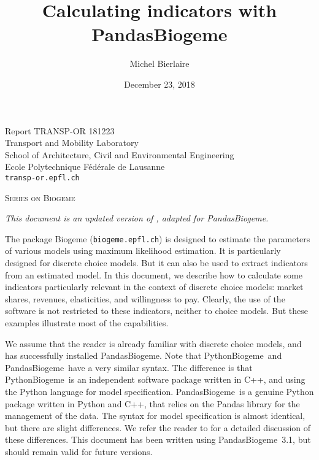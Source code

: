 \documentclass[12pt,a4paper]{article}
\title{Calculating  indicators with PandasBiogeme}
\author{Michel Bierlaire}
\date{December 23, 2018}
\newcommand{\PBIOGEME}{PythonBiogeme}
\newcommand{\PDBIOGEME}{PandasBiogeme}
\begin{document}
\begin{titlepage}
\pagestyle{empty}

\maketitle
\vspace{2cm}

\begin{center}
\small Report TRANSP-OR 181223\\ Transport and Mobility Laboratory \\ School of Architecture, Civil and Environmental Engineering \\ Ecole Polytechnique F\'ed\'erale de Lausanne \\ \verb+transp-or.epfl.ch+
\begin{center}
\textsc{Series on Biogeme}
\end{center}
\end{center}


\clearpage
\end{titlepage}

\emph{This document is an updated version of ,
  adapted for PandasBiogeme.}

The package Biogeme (\texttt{biogeme.epfl.ch}) is designed to estimate the parameters of
various models using maximum likelihood estimation. It is particularly
designed for discrete choice models. But it can also be used to extract indicators from an estimated
model. In this document, we describe how to calculate some indicators
particularly relevant in the context of discrete choice models: market
shares, revenues, elasticities, and willingness to pay. Clearly, the
use of the software is not restricted to these indicators, neither to
choice models. But these examples illustrate most of the
capabilities.

We assume that the reader is already familiar with discrete choice
models, and has successfully installed \PDBIOGEME. Note that
\PBIOGEME\ and \PDBIOGEME\ have a very similar syntax. The difference
is that \PBIOGEME\ is an independent software package written in C++,
and using the Python language for model specification. \PDBIOGEME\ is
a genuine Python package written in Python and C++, that relies on the
Pandas library for the management of the data. The syntax for model
specification is almost identical, but there are slight
differences. We refer the reader to  for a detailed
discussion of these differences. This document has
been written using \PDBIOGEME\ 3.1, but should remain valid for future
versions.
\end{document}
